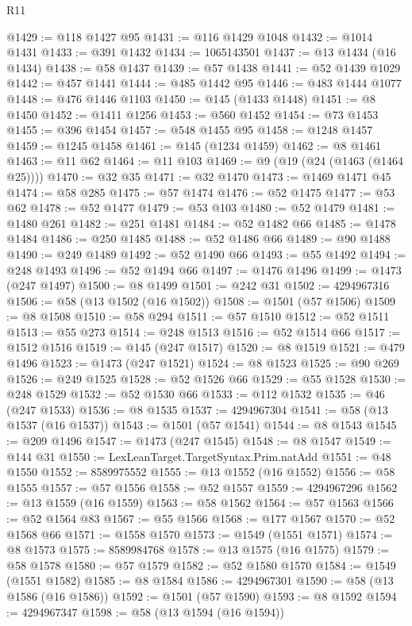 \begin{lexlean}{R11}
\begin{coremodule}
@1429 := @118 @1427 @95
@1431 := @116 @1429 @1048
@1432 := @1014 @1431
@1433 := @391 @1432
@1434 := 1065143501
@1437 := @13 @1434 (@16 @1434)
@1438 := @58 @1437
@1439 := @57 @1438
@1441 := @52 @1439 @1029
@1442 := @457 @1441
@1444 := @485 @1442 @95
@1446 := @483 @1444 @1077
@1448 := @476 @1446 @1103
@1450 := @145 (@1433 @1448)
@1451 := @8 @1450
@1452 := @1411 @1256
@1453 := @560 @1452
@1454 := @73 @1453
@1455 := @396 @1454
@1457 := @548 @1455 @95
@1458 := @1248 @1457
@1459 := @1245 @1458
@1461 := @145 (@1234 @1459)
@1462 := @8 @1461
@1463 := @11 @62
@1464 := @11 @103
@1469 := @9 (@19 (@24 (@1463 (@1464 @25))))
@1470 := @32 @35
@1471 := @32 @1470
@1473 := @1469 @1471 @45
@1474 := @58 @285
@1475 := @57 @1474
@1476 := @52 @1475
@1477 := @53 @62
@1478 := @52 @1477
@1479 := @53 @103
@1480 := @52 @1479
@1481 := @1480 @261
@1482 := @251 @1481
@1484 := @52 @1482 @66
@1485 := @1478 @1484
@1486 := @250 @1485
@1488 := @52 @1486 @66
@1489 := @90 @1488
@1490 := @249 @1489
@1492 := @52 @1490 @66
@1493 := @55 @1492
@1494 := @248 @1493
@1496 := @52 @1494 @66
@1497 := @1476 @1496
@1499 := @1473 (@247 @1497)
@1500 := @8 @1499
@1501 := @242 @31
@1502 := 4294967316
@1506 := @58 (@13 @1502 (@16 @1502))
@1508 := @1501 (@57 @1506)
@1509 := @8 @1508
@1510 := @58 @294
@1511 := @57 @1510
@1512 := @52 @1511
@1513 := @55 @273
@1514 := @248 @1513
@1516 := @52 @1514 @66
@1517 := @1512 @1516
@1519 := @145 (@247 @1517)
@1520 := @8 @1519
@1521 := @479 @1496
@1523 := @1473 (@247 @1521)
@1524 := @8 @1523
@1525 := @90 @269
@1526 := @249 @1525
@1528 := @52 @1526 @66
@1529 := @55 @1528
@1530 := @248 @1529
@1532 := @52 @1530 @66
@1533 := @112 @1532
@1535 := @46 (@247 @1533)
@1536 := @8 @1535
@1537 := 4294967304
@1541 := @58 (@13 @1537 (@16 @1537))
@1543 := @1501 (@57 @1541)
@1544 := @8 @1543
@1545 := @209 @1496
@1547 := @1473 (@247 @1545)
@1548 := @8 @1547
@1549 := @144 @31
@1550 := LexLeanTarget.TargetSyntax.Prim.natAdd
@1551 := @48 @1550
@1552 := 8589975552
@1555 := @13 @1552 (@16 @1552)
@1556 := @58 @1555
@1557 := @57 @1556
@1558 := @52 @1557
@1559 := 4294967296
@1562 := @13 @1559 (@16 @1559)
@1563 := @58 @1562
@1564 := @57 @1563
@1566 := @52 @1564 @83
@1567 := @55 @1566
@1568 := @177 @1567
@1570 := @52 @1568 @66
@1571 := @1558 @1570
@1573 := @1549 (@1551 @1571)
@1574 := @8 @1573
@1575 := 8589984768
@1578 := @13 @1575 (@16 @1575)
@1579 := @58 @1578
@1580 := @57 @1579
@1582 := @52 @1580 @1570
@1584 := @1549 (@1551 @1582)
@1585 := @8 @1584
@1586 := 4294967301
@1590 := @58 (@13 @1586 (@16 @1586))
@1592 := @1501 (@57 @1590)
@1593 := @8 @1592
@1594 := 4294967347
@1598 := @58 (@13 @1594 (@16 @1594))

\end{coremodule}
\end{lexlean}
